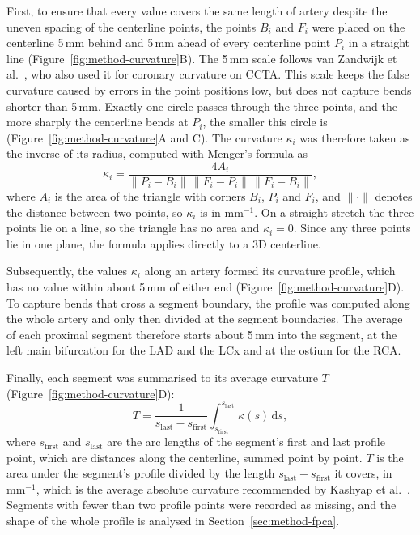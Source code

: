 First, to ensure that every value covers the same length of artery despite the uneven spacing of the centerline points, the points $B_i$ and $F_i$ were placed on the centerline 5\,mm behind and 5\,mm ahead of every centerline point $P_i$ in a straight line (Figure~\ref{fig:method-curvature}B).
The 5\,mm scale follows van Zandwijk et al.\ \cite{vanzandwijk2019curvature}, who also used it for coronary curvature on CCTA.
This scale keeps the false curvature caused by errors in the point positions low, but does not capture bends shorter than 5\,mm.
Exactly one circle passes through the three points, and the more sharply the centerline bends at $P_i$, the smaller this circle is (Figure~\ref{fig:method-curvature}A and C).
The curvature $\kappa_i$ was therefore taken as the inverse of its radius, computed with Menger's formula \cite{menger1930metrik} as
\begin{equation}
  \kappa_i = \frac{4 A_i}{\lVert P_i - B_i \rVert \, \lVert F_i - P_i \rVert \, \lVert F_i - B_i \rVert} ,
  \label{eq:method-profile}
\end{equation}
where $A_i$ is the area of the triangle with corners $B_i$, $P_i$ and $F_i$, and $\lVert \cdot \rVert$ denotes the distance between two points, so $\kappa_i$ is in mm$^{-1}$.
On a straight stretch the three points lie on a line, so the triangle has no area and $\kappa_i = 0$.
Since any three points lie in one plane, the formula applies directly to a 3D centerline.

Subsequently, the values $\kappa_i$ along an artery formed its curvature profile, which has no value within about 5\,mm of either end (Figure~\ref{fig:method-curvature}D).
To capture bends that cross a segment boundary, the profile was computed along the whole artery and only then divided at the segment boundaries.
The average of each proximal segment therefore starts about 5\,mm into the segment, at the left main bifurcation for the LAD and the LCx and at the ostium for the RCA.

Finally, each segment was summarised to its average curvature $T$ (Figure~\ref{fig:method-curvature}D):
\begin{equation}
  T = \frac{1}{s_{\mathrm{last}} - s_{\mathrm{first}}} \int_{s_{\mathrm{first}}}^{s_{\mathrm{last}}} \kappa(s)\,\mathrm{d}s ,
  \label{eq:method-tl}
\end{equation}
where $s_{\mathrm{first}}$ and $s_{\mathrm{last}}$ are the arc lengths of the segment's first and last profile point, which are distances along the centerline, summed point by point.
$T$ is the area under the segment's profile divided by the length $s_{\mathrm{last}} - s_{\mathrm{first}}$ it covers, in mm$^{-1}$, which is the average absolute curvature recommended by Kashyap et al.\ \cite{kashyap2022tortuosity}.
Segments with fewer than two profile points were recorded as missing, and the shape of the whole profile is analysed in Section~\ref{sec:method-fpca}.

